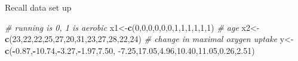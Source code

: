 \documentclass[
  ignorenonframetext,
]{beamer}
\newenvironment{Shaded}{\begin{snugshade}}{\end{snugshade}}
\newcommand{\CommentTok}[1]{\textcolor[rgb]{0.56,0.35,0.01}{\textit{#1}}}
\newcommand{\DecValTok}[1]{\textcolor[rgb]{0.00,0.00,0.81}{#1}}
\newcommand{\FloatTok}[1]{\textcolor[rgb]{0.00,0.00,0.81}{#1}}
\newcommand{\KeywordTok}[1]{\textcolor[rgb]{0.13,0.29,0.53}{\textbf{#1}}}
\newcommand{\NormalTok}[1]{#1}
\newcommand{\OperatorTok}[1]{\textcolor[rgb]{0.81,0.36,0.00}{\textbf{#1}}}
\newcommand{\bY}   {\bm{Y}}
\newcommand{\hbeta}   {\hat{\beta}}
\newcommand{\bbeta}{\bm{\beta}}
\newcommand{\Var}{\text{Var}}
\begin{document}

\begin{frame}[fragile]{Recall data set up}
\protect\hypertarget{recall-data-set-up}{}

\footnotesize

\begin{Shaded}
\begin{Highlighting}[]
\CommentTok{# running is 0, 1 is aerobic}
\NormalTok{x1<-}\KeywordTok{c}\NormalTok{(}\DecValTok{0}\NormalTok{,}\DecValTok{0}\NormalTok{,}\DecValTok{0}\NormalTok{,}\DecValTok{0}\NormalTok{,}\DecValTok{0}\NormalTok{,}\DecValTok{0}\NormalTok{,}\DecValTok{1}\NormalTok{,}\DecValTok{1}\NormalTok{,}\DecValTok{1}\NormalTok{,}\DecValTok{1}\NormalTok{,}\DecValTok{1}\NormalTok{,}\DecValTok{1}\NormalTok{)}
\CommentTok{# age}
\NormalTok{x2<-}\KeywordTok{c}\NormalTok{(}\DecValTok{23}\NormalTok{,}\DecValTok{22}\NormalTok{,}\DecValTok{22}\NormalTok{,}\DecValTok{25}\NormalTok{,}\DecValTok{27}\NormalTok{,}\DecValTok{20}\NormalTok{,}\DecValTok{31}\NormalTok{,}\DecValTok{23}\NormalTok{,}\DecValTok{27}\NormalTok{,}\DecValTok{28}\NormalTok{,}\DecValTok{22}\NormalTok{,}\DecValTok{24}\NormalTok{)}
\CommentTok{# change in maximal oxygen uptake}
\NormalTok{y<-}\KeywordTok{c}\NormalTok{(}\OperatorTok{-}\FloatTok{0.87}\NormalTok{,}\OperatorTok{-}\FloatTok{10.74}\NormalTok{,}\OperatorTok{-}\FloatTok{3.27}\NormalTok{,}\OperatorTok{-}\FloatTok{1.97}\NormalTok{,}\FloatTok{7.50}\NormalTok{,}
     \FloatTok{-7.25}\NormalTok{,}\FloatTok{17.05}\NormalTok{,}\FloatTok{4.96}\NormalTok{,}\FloatTok{10.40}\NormalTok{,}\FloatTok{11.05}\NormalTok{,}\FloatTok{0.26}\NormalTok{,}\FloatTok{2.51}\NormalTok{)}
\end{Highlighting}
\end{Shaded}

\end{frame}
\end{document}
